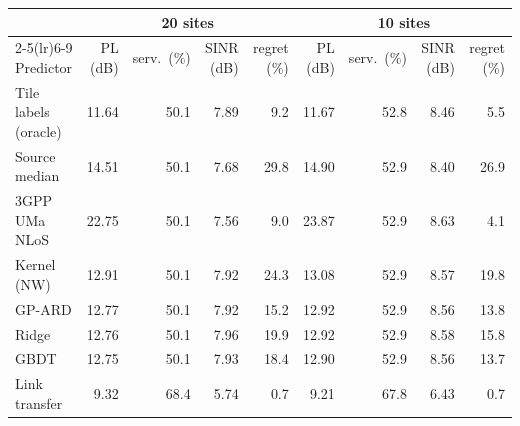 \begin{tabular}{lrrrrrrrr}
\toprule
& \multicolumn{4}{c}{20 sites} & \multicolumn{4}{c}{10 sites} \\
\cmidrule(lr){2-5}\cmidrule(lr){6-9}
Predictor & PL (dB) & serv.\ (\%) & SINR (dB) & regret (\%) & PL (dB) & serv.\ (\%) & SINR (dB) & regret (\%) \\
\midrule
Tile labels (oracle) & 11.64 & 50.1 & 7.89 & 9.2 & 11.67 & 52.8 & 8.46 & 5.5 \\
\midrule
Source median & 14.51 & 50.1 & 7.68 & 29.8 & 14.90 & 52.9 & 8.40 & 26.9 \\
3GPP UMa NLoS & 22.75 & 50.1 & 7.56 & 9.0 & 23.87 & 52.9 & 8.63 & 4.1 \\
Kernel (NW) & 12.91 & 50.1 & 7.92 & 24.3 & 13.08 & 52.9 & 8.57 & 19.8 \\
GP-ARD & 12.77 & 50.1 & 7.92 & 15.2 & 12.92 & 52.9 & 8.56 & 13.8 \\
Ridge & 12.76 & 50.1 & 7.96 & 19.9 & 12.92 & 52.9 & 8.58 & 15.8 \\
GBDT & 12.75 & 50.1 & 7.93 & 18.4 & 12.90 & 52.9 & 8.56 & 13.7 \\
Link transfer & 9.32 & 68.4 & 5.74 & 0.7 & 9.21 & 67.8 & 6.43 & 0.7 \\
\bottomrule
\end{tabular}
